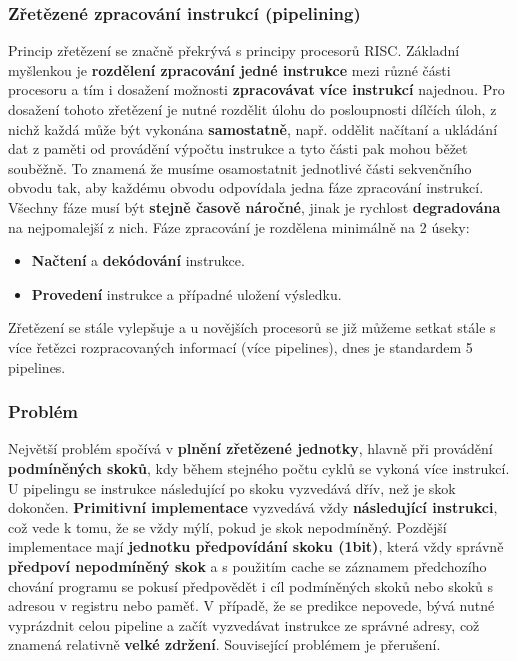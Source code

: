 \subsubsection{Zřetězené zpracování instrukcí (pipelining)}
Princip zřetězení se značně překrývá s principy procesorů RISC.
 Základní myšlenkou je \textbf{rozdělení zpracování jedné instrukce} mezi různé části procesoru a tím i dosažení možnosti \textbf{zpracovávat} \textbf{více instrukcí }najednou. Pro dosažení tohoto zřetězení je nutné rozdělit úlohu do posloupnosti dílčích úloh, z nichž každá může být vykonána \textbf{samostatně}, např. oddělit načítaní a ukládání dat z paměti od provádění výpočtu instrukce a tyto části pak mohou běžet souběžně. To znamená že musíme osamostatnit jednotlivé části sekvenčního obvodu tak, aby každému obvodu odpovídala jedna fáze zpracování instrukcí. Všechny fáze musí být \textbf{stejně časově náročné}, jinak je rychlost \textbf{degradována} na nejpomalejší z nich. Fáze zpracování je rozdělena minimálně na 2 úseky:
\begin{itemize}
\item \textbf{Načtení} a \textbf{dekódování} instrukce.
\item \textbf{Provedení} instrukce a případné uložení výsledku.
\end{itemize}
Zřetězení se stále vylepšuje a u novějších procesorů se již můžeme setkat stále s více řetězci rozpracovaných informací (více pipelines), dnes je standardem 5 pipelines.

\subsubsection{Problém}
Největší problém spočívá v \textbf{plnění zřetězené jednotky}, hlavně při provádění \textbf{podmíněných skoků}, kdy během stejného počtu cyklů se vykoná více instrukcí. U pipelingu se instrukce následující po skoku vyzvedává dřív, než je skok dokončen. \textbf{Primitivní implementace} vyzvedává vždy \textbf{následující instrukci}, což vede k tomu, že se vždy mýlí, pokud je skok nepodmíněný. Pozdější implementace mají \textbf{jednotku předpovídání skoku (1bit)}, která vždy správně \textbf{předpoví nepodmíněný skok} a s použitím cache se záznamem předchozího chování programu se pokusí předpovědět i cíl podmíněných skoků nebo skoků s adresou v registru nebo paměť. V případě, že se predikce nepovede, bývá nutné vyprázdnit celou pipeline a začít vyzvedávat instrukce ze správné adresy, což znamená relativně \textbf{velké zdržení}. Související problémem je přerušení.

